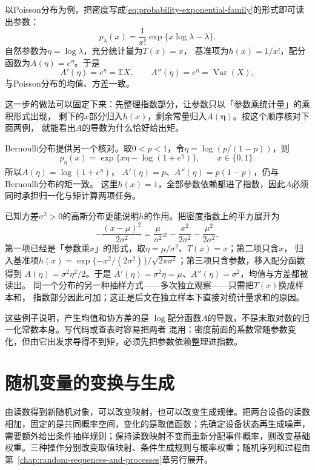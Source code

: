 以Poisson分布为例，把密度写成\eqref{eq:probability-exponential-family}的形式即可读出参数：
\[ p_\lambda(x)
  =\frac{1}{x!}\exp\{x\log\lambda-\lambda\}. \]
自然参数为\(\eta=\log\lambda\)，充分统计量为\(T(x)=x\)，
基准项为\(h(x)=1/x!\)，配分函数为\(A(\eta)=e^\eta\)。于是
\[ A'(\eta)=e^\eta=\mathbb{E}X,
  \qquad A''(\eta)=e^\eta=\operatorname{Var}(X), \]
与Poisson分布的均值、方差一致。

这一步的做法可以固定下来：先整理指数部分，让参数只以「参数乘统计量」的乘积形式出现，
剩下的\(x\)部分归入\(h(x)\)，剩余常量归入\(A(\bm\eta)\)。按这个顺序核对下面两例，
就能看出\(A\)的导数为什么恰好给出矩。

Bernoulli分布提供另一个核对。取\(0<p<1\)，令\(\eta=\log(p/(1-p))\)，则
\[
  p_\eta(x)=\exp\{x\eta-\log(1+e^\eta)\},
  \qquad x\in\{0,1\}.
\]
所以\(A(\eta)=\log(1+e^\eta)\)，
\(A'(\eta)=p\)、\(A''(\eta)=p(1-p)\)，仍与Bernoulli分布的矩一致。
这里\(h(x)=1\)，全部参数依赖都进了指数，因此\(A\)必须同时承担归一化与矩计算两项任务。

已知方差\(\sigma^2>0\)的高斯分布更能说明\(h\)的作用。把密度指数上的平方展开为
\[
  -\frac{(x-\mu)^2}{2\sigma^2}
  =\frac{\mu}{\sigma^2}x-\frac{x^2}{2\sigma^2}-\frac{\mu^2}{2\sigma^2},
\]
第一项已经是「参数乘\(x\)」的形式，取\(\eta=\mu/\sigma^2\)、\(T(x)=x\)；第二项只含\(x\)，
归入基准项\(h(x)=\exp\{-x^2/(2\sigma^2)\}/\sqrt{2\pi\sigma^2}\)；第三项只含参数，移入配分函数得到
\(A(\eta)=\sigma^2\eta^2/2\)。于是
\(A'(\eta)=\sigma^2\eta=\mu\)、\(A''(\eta)=\sigma^2\)，均值与方差都被读出。
同一个分布的另一种抽样方式——多次独立观察——只需把\(T(x)\)换成样本和，
指数部分因此可加；这正是后文在独立样本下直接对统计量求和的原因。

这些例子说明，产生均值和协方差的是
\(\log\)配分函数\(A\)的导数，不是未取对数的归一化常数本身。写代码或查表时容易把两者
混用：密度前面的系数常随参数变化，但由它出发求导得不到矩，必须先把参数依赖整理进指数。

\section{随机变量的变换与生成}
\label{sec:rv-transformations}
\label{sec:probability-random-vectors-transformations}
由读数得到新随机对象，可以改变映射，也可以改变生成规律。把两台设备的读数相加，固定的是共同概率空间，变化的是取值函数；先确定设备状态再生成噪声，需要额外给出条件抽样规则；保持读数映射不变而重新分配事件概率，则改变基础权重。三种操作分别改变取值映射、条件生成规则与概率权重；随机序列和过程由第~\ref{chap:random-sequences-and-processes}章另行展开。

